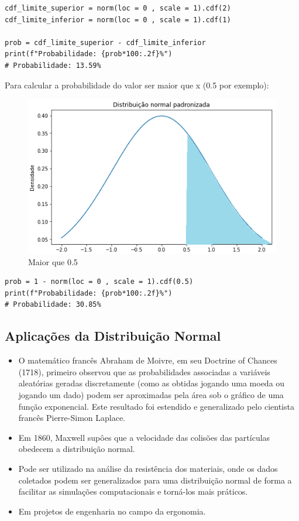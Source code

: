 \begin{verbatim}
cdf_limite_superior = norm(loc = 0 , scale = 1).cdf(2)
cdf_limite_inferior = norm(loc = 0 , scale = 1).cdf(1)

prob = cdf_limite_superior - cdf_limite_inferior
print(f"Probabilidade: {prob*100:.2f}%")
# Probabilidade: 13.59%
\end{verbatim}

Para calcular a probabilidade do valor ser maior que x (0.5 por exemplo): 

\begin{figure}[H]
	\centering
	\includegraphics[width=1\textwidth]{./Imagens/Distribuição Normal/GA7.png} 
	\caption{Maior que 0.5}
	\label{fig:GA7}
\end{figure}

\begin{verbatim}
prob = 1 - norm(loc = 0 , scale = 1).cdf(0.5)
print(f"Probabilidade: {prob*100:.2f}%")
# Probabilidade: 30.85%
\end{verbatim}

\subsection{Aplicações da Distribuição Normal}
\begin{itemize}
\item O matemático francês Abraham de Moivre, em seu Doctrine of Chances (1718), primeiro observou que as probabilidades associadas a variáveis aleatórias geradas discretamente (como as obtidas jogando uma moeda ou jogando um dado) podem ser aproximadas pela área sob o gráfico de uma função exponencial. Este resultado foi estendido e generalizado pelo cientista francês Pierre-Simon Laplace.
\item Em 1860, Maxwell supôes que a velocidade das colisões das partículas obedecem a distribuição normal.
\item Pode ser utilizado na análise da resistência dos materiais, onde os dados coletados podem ser generalizados para uma distribuição normal de forma a facilitar as simulações computacionais e torná-los mais práticos. 
\item Em projetos de engenharia no campo da ergonomia.
\end{itemize}